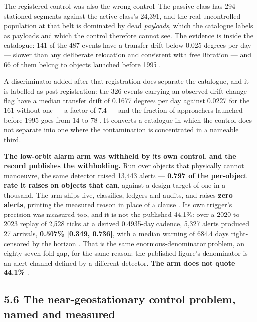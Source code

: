 \documentclass[11pt]{article}
\begin{document}
The registered control was also the wrong control. The passive class has 294 stationed segments against the active class's 24,391, and the real uncontrolled population at that belt is dominated by dead \emph{payloads}, which the catalogue labels as payloads and which the control therefore cannot see. The evidence is inside the catalogue: 141 of the 487 events have a transfer drift below 0.025 degrees per day --- slower than any deliberate relocation and consistent with free libration --- and 66 of them belong to objects launched before 1995%
.

A discriminator added after that registration does separate the catalogue, and it is labelled as post-registration: the 326 events carrying an observed drift-change flag have a median transfer drift of 0.1677 degrees per day against 0.0227 for the 161 without one --- a factor of 7.4 --- and the fraction of approachers launched before 1995 goes from 14 to 78%
. It converts a catalogue in which the control does not separate into one where the contamination is concentrated in a nameable third.

\textbf{The low-orbit alarm arm was withheld by its own control, and the record publishes the withholding.} Run over objects that physically cannot manoeuvre, the same detector raised 13,443 alerts --- \textbf{0.797 of the per-object rate it raises on objects that can}, against a design target of one in a thousand. The arm ships live, classifies, ledgers and audits, and raises \textbf{zero alerts}, printing the measured reason in place of a clause%
. Its own trigger's precision was measured too, and it is not the published 44.1\%: over a 2020 to 2023 replay of 2,528 ticks at a derived 0.4935-day cadence, 5,327 alerts produced 27 arrivals, \textbf{0.507\% [0.349, 0.736]}, with a median warning of 684.4 days right-censored by the horizon%
. That is the same enormous-denominator problem, an eighty-seven-fold gap, for the same reason: the published figure's denominator is an alert channel defined by a different detector. \textbf{The arm does not quote 44.1\%}%
.

\subsection*{5.6 The near-geostationary control problem, named and measured}
\end{document}
